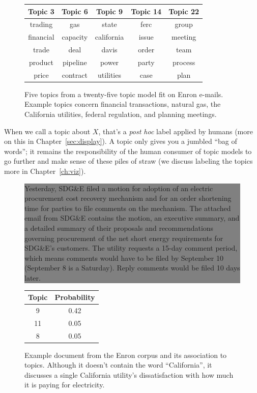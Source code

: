 \begin{figure}
\begin{center}
  \begin{tabular}{ccccc}
    Topic 3    & Topic 6   & Topic 9    & Topic 14 & Topic 22 \\
    \hline
    trading    & gas       & state      & ferc     & group \\
    financial  & capacity  & california & issue    & meeting \\
    trade      & deal      & davis      & order    & team \\
    product    & pipeline  & power      & party    & process \\
    price      & contract  & utilities  & case     & plan \\
    \hline
  \end{tabular}
\end{center}

  \caption{Five topics from a twenty-five topic model fit on Enron
    e-mails.  Example topics concern financial transactions, natural
    gas, the California utilities, federal regulation, and planning
    meetings.}
  \label{fig:enron_topics}
\end{figure}

When we call a topic about $X$, that's a \textit{post hoc} label
applied by humans (more on this in Chapter~\ref{sec:display}).  A
topic only gives you a jumbled ``bag of words''; it remains the
responsibility of the human consumer of topic models to go further and
make sense of these piles of straw (we discuss labeling the topics
more in Chapter~\ref{ch:viz}).

\begin{figure}

\begin{center}
\colorbox{gray}{ \parbox{.9\linewidth}{
Yesterday, SDG\&E filed a motion for adoption of an
electric procurement cost recovery mechanism and for an order
shortening time for parties to file comments on the mechanism. The
attached email from SDG\&E contains the motion, an executive summary,
and a detailed summary of their proposals and recommendations
governing procurement of the net short energy requirements for
SDG\&E's customers. The utility requests a 15-day comment period, which
means comments would have to be filed by September 10 (September 8
is a Saturday). Reply comments would be filed 10 days later.}}

\begin{tabular}{cc}
  Topic & Probability \\
  \hline
  9 & 0.42 \\
  11 & 0.05 \\
  8 & 0.05 \\
  \hline
\end{tabular}
\end{center}
  \caption{Example document from the Enron corpus and its association
    to topics.  Although it doesn't contain the word ``California'',
    it discusses a single California utility's dissatisfaction with how
    much it is paying for electricity.}
  \label{fig:enron_doc}
\end{figure}

